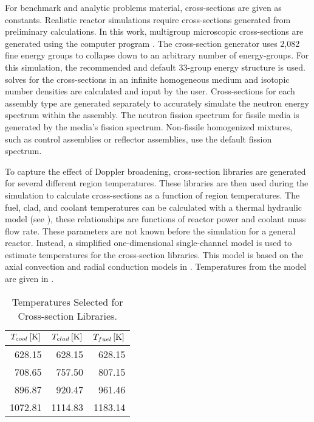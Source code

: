   For benchmark and analytic problems material, cross-sections are given as
  constants. Realistic reactor simulations require
  cross-sections generated from preliminary calculations. In this
  work, multigroup microscopic cross-sections are generated using the computer
  program \mcc \cite{mcc}.
  The cross-section generator uses 2,082 fine energy groups to collapse down
  to an arbitrary number of energy-groups. For this simulation, the
  recommended and default 33-group energy structure is used. \mcc 
  solves for the cross-sections in an infinite homogeneous medium and isotopic 
  number densities are calculated and input by the user.
  Cross-sections for each assembly type are generated separately to accurately
  simulate the neutron energy spectrum within the assembly. The neutron fission  
  spectrum for fissile media is generated by the media's fission spectrum. 
  Non-fissile homogenized mixtures, such as control assemblies or reflector
  assemblies, use the default  fission spectrum. 

  To capture the effect of Doppler broadening, cross-section libraries are
  generated for several different region temperatures. These libraries are
  then used during the simulation to calculate cross-sections as a function of 
  region temperatures.
  The fuel, clad, and coolant temperatures can be calculated with a thermal
  hydraulic model (see ), these relationships are 
  functions of reactor power and coolant mass flow rate. These parameters are
  not known before the simulation for a general reactor. Instead, a simplified
  one-dimensional single-channel model is used to estimate temperatures for the
  cross-section libraries. This model is based on the axial convection and
  radial conduction models in . Temperatures from
  the model are given in .

  \begin{table}
    \caption{Temperatures Selected for Cross-section Libraries.}
    \label{tab:xstemps}
    \begin{center}
      \begin{tabular}{rrr}
        \toprule
        $T_{cool} \left[\text{{K}}\right]$ & $T_{clad} \left[\text{{K}}\right]$ & $T_{fuel} \left[\text{{K}}\right]$ \\
        \midrule
        628.15 & 628.15 & 628.15  \\
        708.65 & 757.50 & 807.15  \\
        896.87 & 920.47 & 961.46 \\
        1072.81 & 1114.83 & 1183.14 \\
        \bottomrule
      \end{tabular}
    \end{center}
  \end{table}

